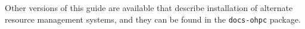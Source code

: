 
Other versions of this guide are available that describe installation of alternate
resource management systems, and they can be found in the \texttt{docs-ohpc}
package.

